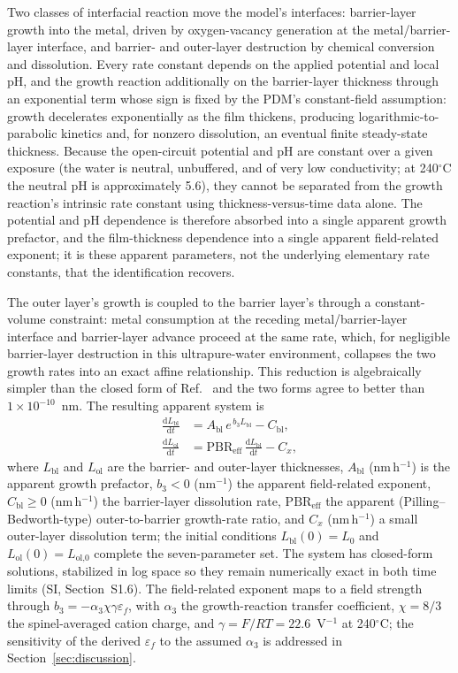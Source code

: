 \documentclass[preprint,12pt]{elsarticle}
\begin{document}
Two classes of interfacial reaction move the model's interfaces:
barrier-layer growth into the metal, driven by oxygen-vacancy generation
at the metal/barrier-layer interface, and barrier- and outer-layer
destruction by chemical conversion and dissolution. Every rate constant
depends on the applied potential and local pH, and the growth reaction
additionally on the barrier-layer thickness through an exponential term
whose sign is fixed by the PDM's constant-field assumption: growth
decelerates exponentially as the film thickens, producing
logarithmic-to-parabolic kinetics and, for nonzero dissolution, an
eventual finite steady-state thickness. Because the open-circuit
potential and pH are constant over a given exposure (the water is
neutral, unbuffered, and of very low conductivity; at 240$^\circ$C the
neutral pH is approximately 5.6), they cannot be separated from the
growth reaction's intrinsic rate constant using thickness-versus-time
data alone. The potential and pH dependence is therefore absorbed into
a single apparent growth prefactor, and the film-thickness dependence
into a single apparent field-related exponent; it is these apparent
parameters, not the underlying elementary rate constants, that the
identification recovers.

The outer layer's growth is coupled to the barrier layer's through a
constant-volume constraint: metal consumption at the receding
metal/barrier-layer interface and barrier-layer advance proceed at the
same rate, which, for negligible barrier-layer destruction in this
ultrapure-water environment, collapses the two growth rates into an
exact affine relationship. This reduction is algebraically simpler than
the closed form of Ref.~\citep{li2020scwpdm} and the two forms agree to
better than $1\times10^{-10}$~nm. The resulting apparent system is
\begin{align}
\frac{\mathrm{d}L_\text{bl}}{\mathrm{d}t} &=
A_\text{bl}\, e^{\,b_3 L_\text{bl}} - C_\text{bl},
\label{eq:odebl}\\
\frac{\mathrm{d}L_\text{ol}}{\mathrm{d}t} &=
\mathrm{PBR}_\text{eff}\,
\frac{\mathrm{d}L_\text{bl}}{\mathrm{d}t} - C_x,
\label{eq:odeol}
\end{align}
where $L_\text{bl}$ and $L_\text{ol}$ are the barrier- and outer-layer
thicknesses, $A_\text{bl}$ (nm\,h$^{-1}$) is the apparent growth
prefactor, $b_3<0$ (nm$^{-1}$) the apparent field-related exponent,
$C_\text{bl}\ge0$ (nm\,h$^{-1}$) the barrier-layer dissolution rate,
$\mathrm{PBR}_\text{eff}$ the apparent (Pilling--Bedworth-type)
outer-to-barrier growth-rate ratio, and $C_x$ (nm\,h$^{-1}$) a small
outer-layer dissolution term; the initial conditions
$L_\text{bl}(0)=L_0$ and $L_\text{ol}(0)=L_\text{ol,0}$ complete the
seven-parameter set. The system has closed-form solutions, stabilized in
log space so they remain numerically exact in both time limits (SI,
Section~S1.6). The field-related exponent maps to a field strength
through $b_3 = -\alpha_3\chi\gamma\varepsilon_f$, with $\alpha_3$ the
growth-reaction transfer coefficient, $\chi=8/3$ the spinel-averaged
cation charge, and $\gamma = F/RT = 22.6$~V$^{-1}$ at 240$^\circ$C; the
sensitivity of the derived $\varepsilon_f$ to the assumed $\alpha_3$ is
addressed in Section~\ref{sec:discussion}.
\end{document}
